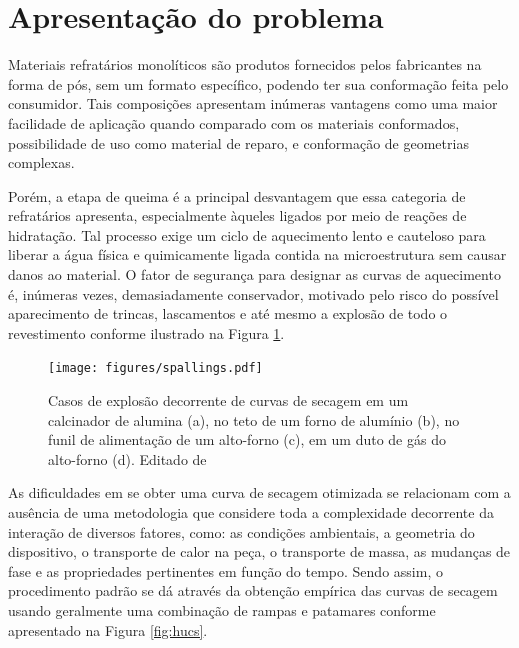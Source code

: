 \section{Apresentação do problema}
Materiais refratários monolíticos são produtos fornecidos pelos fabricantes na
forma de pós, sem um formato específico, podendo ter sua conformação feita pelo
consumidor. Tais composições apresentam inúmeras vantagens como uma maior
facilidade de aplicação quando comparado com os materiais conformados,
possibilidade de uso como material de reparo, e conformação de geometrias
complexas.

Porém, a etapa de queima é a principal desvantagem que essa categoria de
refratários apresenta, especialmente àqueles ligados por meio de reações de
hidratação. Tal processo exige um ciclo de aquecimento lento e cauteloso para
liberar a água física e quimicamente ligada contida na microestrutura sem causar
danos ao material. O fator de segurança para designar as curvas de aquecimento
é, inúmeras vezes, demasiadamente conservador, motivado pelo risco do possível
aparecimento de trincas, lascamentos e até mesmo a explosão de todo o
revestimento conforme ilustrado na Figura \ref{fig:spalls}.
    
    \begin{figure}[!ht]
        \centering
        \texttt{[image: figures/spallings.pdf]}
        \caption{Casos de explosão decorrente de curvas de secagem em um
          calcinador de alumina (a), no teto de um forno de alumínio (b), no
          funil de alimentação de um alto-forno (c), em um duto de gás do
          alto-forno (d). Editado de \cite{irish}}
        \label{fig:spalls}
   \end{figure}

   As dificuldades em se obter uma curva de secagem otimizada se relacionam com
   a ausência de uma metodologia que considere toda a complexidade decorrente da
   interação de diversos fatores, como: as condições ambientais, a geometria do
   dispositivo, o transporte de calor na peça, o transporte de massa, as
   mudanças de fase e as propriedades pertinentes em função do tempo. Sendo
   assim, o procedimento padrão se dá através da obtenção empírica das curvas de
   secagem usando geralmente uma combinação de rampas e patamares conforme
   apresentado na Figura \ref{fig:hucs}.
      
